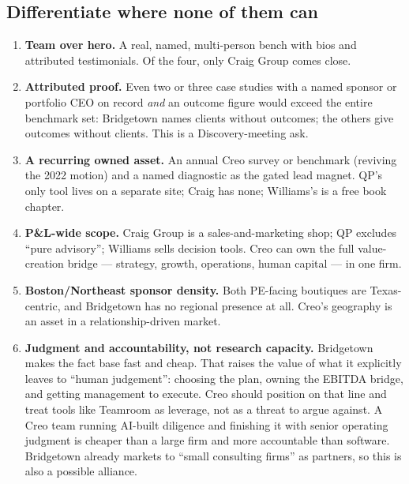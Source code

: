 \documentclass[11pt]{article}
\begin{document}
\subsection{Differentiate where none of them can}
\begin{enumerate}
  \item \textbf{Team over hero.} A real, named, multi-person bench with bios and
  attributed testimonials. Of the four, only Craig Group comes close.
  \item \textbf{Attributed proof.} Even two or three case studies with a named sponsor
  or portfolio CEO on record \emph{and} an outcome figure would exceed the entire
  benchmark set: Bridgetown names clients without outcomes; the others give outcomes
  without clients. This is a Discovery-meeting ask.
  \item \textbf{A recurring owned asset.} An annual Creo survey or benchmark (reviving
  the 2022 motion) and a named diagnostic as the gated lead magnet. QP's only tool
  lives on a separate site; Craig has none; Williams's is a free book chapter.
  \item \textbf{P\&L-wide scope.} Craig Group is a sales-and-marketing shop; QP
  excludes ``pure advisory''; Williams sells decision tools. Creo can own the full
  value-creation bridge --- strategy, growth, operations, human capital --- in one firm.
  \item \textbf{Boston/Northeast sponsor density.} Both PE-facing boutiques are
  Texas-centric, and Bridgetown has no regional presence at all. Creo's geography is
  an asset in a relationship-driven market.
  \item \textbf{Judgment and accountability, not research capacity.} Bridgetown
  makes the fact base fast and cheap. That raises the value of what it explicitly
  leaves to ``human judgement'': choosing the plan, owning the EBITDA bridge, and
  getting management to execute. Creo should position on that line and treat tools
  like Teamroom as leverage, not as a threat to argue against. A Creo team running
  AI-built diligence and finishing it with senior operating judgment is cheaper than
  a large firm and more accountable than software. Bridgetown already markets to
  ``small consulting firms'' as partners, so this is also a possible alliance.
\end{enumerate}
\end{document}
